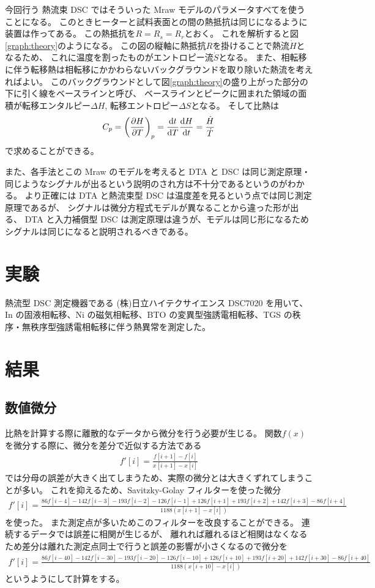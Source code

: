 \documentclass[9pt,dvipdfmx,a4paper]{jsarticle}
\begin{document}
今回行う 熱流束 DSC ではそういった Mraw モデルのパラメータすべてを使うことになる。
このときヒーターと試料表面との間の熱抵抗は同じになるように装置は作ってある。
この熱抵抗を\(R=R_s=R_r\)とおく。
これを解析すると図\ref{graph:theory}のようになる\cite{saito1987}。
この図の縦軸に熱抵抗\(R\)を掛けることで熱流\(\dot{H}\)となるため、
これに温度を割ったものがエントロピー流\(\dot{S}\)となる。
また、相転移に伴う転移熱は相転移にかかわらないバックグラウンドを取り除いた熱流を考えればよい。
このバックグラウンドとして図\ref{graph:theory}の盛り上がった部分の下に引く線をベースラインと呼び、
ベースラインとピークに囲まれた領域の面積が転移エンタルピー\(\Delta H\), 転移エントロピー\(\Delta S\)となる。
そして比熱は
\begin{align}
    C_p = \qty(\pdv{H}{T})_p = \dv{t}{T}\dv{H}{t} = \frac{\dot{H}}{\dot{T}}
\end{align}
で求めることができる。

また、各手法とこの Mraw のモデルを考えると DTA と DSC は同じ測定原理・同じようなシグナルが出るという説明のされ方は不十分であるというのがわかる。
より正確には DTA と熱流束型 DSC は温度差を見るという点では同じ測定原理であるが、
シグナルは微分方程式モデルが異なることから違った形が出る、
DTA と入力補償型 DSC は測定原理は違うが、モデルは同じ形になるためシグナルは同じになると説明されるべきである。

\section{実験}
熱流型 DSC 測定機器である (株)日立ハイテクサイエンス DSC7020 を用いて、
In の固液相転移、Ni の磁気相転移、BTO の変異型強誘電相転移、TGS の秩序・無秩序型強誘電相転移に伴う熱異常を測定した。

\section{結果}
\subsection{数値微分}
比熱を計算する際に離散的なデータから微分を行う必要が生じる。
関数\(f(x)\)を微分する際に、微分を差分で近似する方法である
\begin{align}
    f'[i] = \frac{f[i+1]-f[i]}{x[i+1]-x[i]}
\end{align}
では分母の誤差が大きく出てしまうため、実際の微分とは大きくずれてしまうことが多い。
これを抑えるため、Savitzky-Golay フィルターを使った微分
\begin{align}
    f'[i] = \frac{86f[i-4]-142f[i-3]-193f[i-2]-126f[i-1]+126f[i+1]+193f[i+2]+142f[i+3]-86f[i+4]}{1188(x[i+1]-x[i])}
\end{align}
を使った。
また測定点が多いためこのフィルターを改良することができる。
連続するデータでは誤差に相関が生じるが、
離れれば離れるほど相関はなくなるため差分は離れた測定点同士で行うと誤差の影響が小さくなるので微分を
\begin{align}
    f'[i] = \frac{86f[i-40]-142f[i-30]-193f[i-20]-126f[i-10]+126f[i+10]+193f[i+20]+142f[i+30]-86f[i+40]}{1188( x[i+10]-x[i])}
\end{align}
というようにして計算をする。
\end{document}

